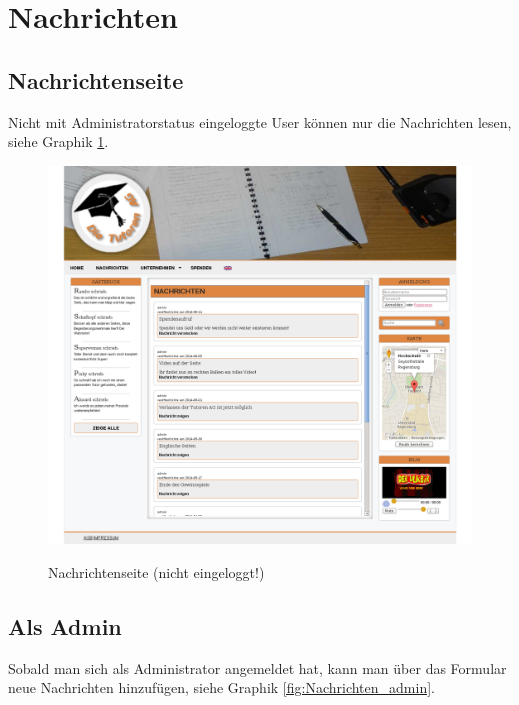 
\section{Nachrichten}

\subsection{Nachrichtenseite}

Nicht mit Administratorstatus eingeloggte User können nur die Nachrichten lesen, siehe Graphik \ref{fig:Nachrichten}.

\begin{figure}[!htbp]
 \centering
 \includegraphics[width=1\textwidth]{../Screenshots/de/Nachrichten}
 \label{fig:Nachrichten}
 \caption{Nachrichtenseite (nicht eingeloggt!)}
\end{figure}

\newpage

\subsection{Als Admin}

Sobald man sich als Administrator angemeldet hat, kann man über das Formular neue Nachrichten hinzufügen, siehe Graphik \ref{fig:Nachrichten_admin}.

